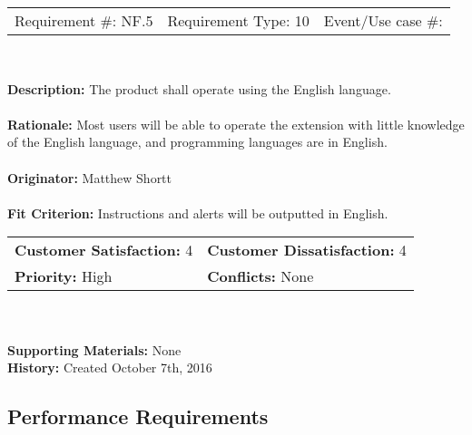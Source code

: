 \documentclass[12pt, titlepage]{article}
\begin{document}
\begin{framed}
	
	\begin{center}
		
		\begin{tabular}{ l c r }
			Requirement \#: NF.5 & Requirement Type: 10 & Event/Use case \#: \\
		\end{tabular} \\
	\end{center}
	\textbf{Description:} The product shall operate using the English language.\\
	\\
	\textbf{Rationale:} Most users will be able to operate the extension with little knowledge 
	of the English language, and programming languages are in English.  \\
	\\
	\textbf{Originator:} Matthew Shortt \\
	\\
	\textbf{Fit Criterion:} Instructions and alerts will be outputted in English.  
	\\
	
	\begin{tabular}{ll}
		\textbf{Customer Satisfaction:} 4 & \textbf{Customer Dissatisfaction:} 4 \\
		\textbf{Priority:} High & \textbf{Conflicts:} None\\
	\end{tabular} \\
	\\
	\textbf{Supporting Materials:} None \\
	\textbf{History:} Created October 7th, 2016
	
\end{framed}


\subsection{Performance Requirements}
\end{document}
